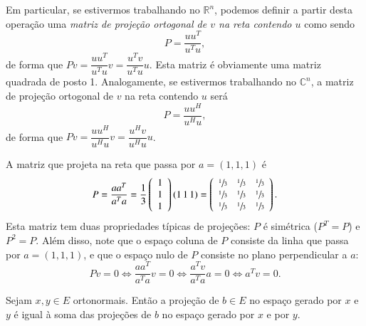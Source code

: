 Em particular, se estivermos trabalhando no ${\mathbb{R}}^n$, podemos definir a partir desta operação uma \emph{matriz de projeção ortogonal de $v$ na reta contendo $u$} como sendo
\begin{equation*}
  P = \frac{uu^T}{u^Tu},
\end{equation*}
de forma que $Pv = \dfrac{u u^T}{u^Tu} v = \dfrac{u^Tv}{u^Tu} u$. Esta matriz é obviamente uma matriz quadrada de posto 1. Analogamente, se estivermos trabalhando no ${\mathbb{C}}^n$, a matriz de projeção ortogonal de $v$ na reta contendo $u$ será
\begin{equation*}
  P = \frac{uu^H}{u^Hu},
\end{equation*}
de forma que $Pv = \dfrac{u u^H}{u^Hu} v = \dfrac{u^Hv}{u^Hu} u$.

\begin{exemplo}
  A matriz que projeta na reta que passa por $a=(1,1,1)$ é
  \begin{equation*}
    P = \frac{aa^T}{a^Ta} = \frac{1}{3} \left(
      \begin{array}{c}
        1\\1\\1
      \end{array}
    \right) (1\, 1\, 1) = \left(
      \begin{array}{c c c}
        \sfrac{1}{3}&\sfrac{1}{3}&\sfrac{1}{3}\\
        \sfrac{1}{3}&\sfrac{1}{3}&\sfrac{1}{3}\\
        \sfrac{1}{3}&\sfrac{1}{3}&\sfrac{1}{3}
      \end{array}
    \right).
  \end{equation*}
  Esta matriz tem duas propriedades típicas de projeções: $P$ é simétrica ($P^T=P$) e $P^2 = P$. Além disso, note que o espaço coluna de $P$ consiste da linha que passa por $a=(1,1,1)$, e que o espaço nulo de $P$ consiste no plano perpendicular a $a$:
  \begin{equation*}
    Pv = 0 \Leftrightarrow \frac{aa^T}{a^Ta}v = 0 \Leftrightarrow \frac{a^Tv}{a^Ta} a=0 \Leftrightarrow a^Tv=0.
  \end{equation*}
\end{exemplo}

\begin{teo}
Sejam $x,y\in E$ ortonormais. Então a projeção de $b\in E$ no espaço gerado por $x$ e $y$ é igual à soma das projeções de $b$ no espaço gerado por $x$ e por $y$.
\end{teo}

